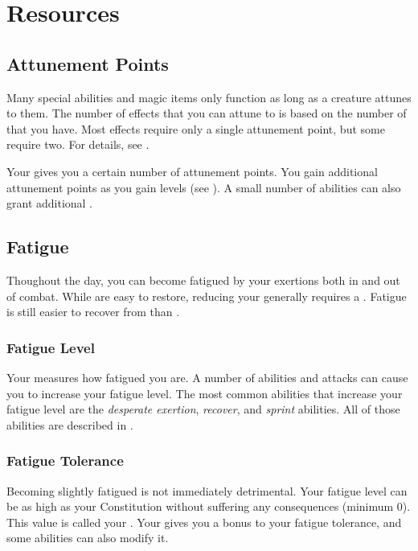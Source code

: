 \section{Resources}\label{Resources}

    \subsection{Attunement Points}\label{Attunement Points}
        Many special abilities and magic items only function as long as a creature attunes to them.
        The number of effects that you can attune to is based on the number of  that you have.
        Most effects require only a single attunement point, but some require two.
        For details, see .

        Your  gives you a certain number of attunement points.
        You gain additional attunement points as you gain levels (see ).
        A small number of abilities can also grant additional .

    \subsection{Fatigue}\label{Fatigue}
        Thoughout the day, you can become fatigued by your exertions both in and out of combat.
        While  are easy to restore, reducing your  generally requires a .
        Fatigue is still easier to recover from than .

        \subsubsection{Fatigue Level}\label{Fatigue Level}
            Your  measures how fatigued you are.
            A number of abilities and attacks can cause you to increase your fatigue level.
            The most common abilities that increase your fatigue level are the \textit{desperate exertion}, \textit{recover}, and \textit{sprint} abilities.
            All of those abilities are described in .

            \subsubsection{Fatigue Tolerance}\label{Fatigue Tolerance}
                Becoming slightly fatigued is not immediately detrimental.
                Your fatigue level can be as high as your Constitution without suffering any consequences (minimum 0).
                This value is called your .
                Your  gives you a bonus to your fatigue tolerance, and some abilities can also modify it.

